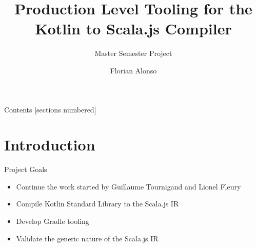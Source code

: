 \documentclass[10pt]{beamer}
\title{Production Level Tooling for the Kotlin to Scala.js Compiler}
\subtitle{Master Semester Project}
\date{}
\author{Florian Alonso}
\institute{EPFL - Programming Methods Laboratory (LAMP) }
\begin{document}
\begin{frame}
  \titlepage
\end{frame}

\begin{frame}[fragile]{Contents}
  [sections numbered]
  \tableofcontents[hideallsubsections]
\end{frame}

\section{Introduction}

\begin{frame}{Project Goals}
 \begin{itemize}
  \item Continue the work started by Guillaume Tournigand and Lionel Fleury
  \item Compile Kotlin Standard Library to the Scala.js IR
  \item Develop Gradle tooling
  \item Validate the generic nature of the Scala.js IR
 \end{itemize}

\end{frame}
\end{document}
